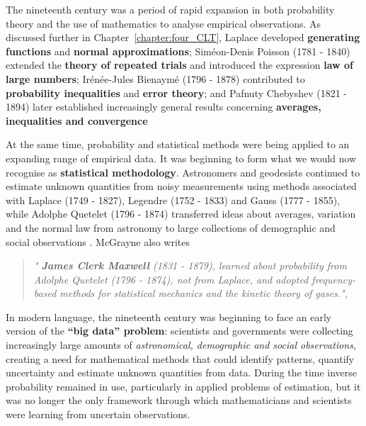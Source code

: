 The nineteenth century was a period of rapid expansion in both probability theory and the use of mathematics to analyse empirical observations. As discussed further in Chapter~\ref{chapter:four_CLT}, Laplace developed \textbf{generating functions} and \textbf{normal approximations}; Siméon-Denis Poisson (1781 - 1840) extended the \textbf{theory of repeated trials} and introduced the expression \textbf{law of large numbers}; Irénée-Jules Bienaymé (1796 - 1878) contributed to \textbf{probability inequalities} and \textbf{error theory}; and Pafnuty Chebyshev (1821 - 1894) later established increasingly general results concerning \textbf{averages, inequalities and convergence} \cite{poissonnn1837} \cite{bienayme1853} \cite{chebyshev1867}

At the same time, probability and statistical methods were being applied to an expanding range of empirical data. It was beginning to form what we would now recognise as \textbf{statistical methodology}. Astronomers and geodesists continued to estimate unknown quantities from noisy measurements using methods associated with Laplace (1749 - 1827), Legendre (1752 - 1833) and Gauss (1777 - 1855), while Adolphe Quetelet (1796 - 1874) transferred ideas about averages, variation and the normal law from astronomy to large collections of demographic and social observations \cite{stigler1986,gauss1809,quetelet1835}. McGrayne also writes 

\begin{quote}
\textit{" \textbf{James Clerk Maxwell} (1831 - 1879), learned about probability from Adolphe Quetelet (1796 - 1874), not from Laplace, and adopted frequency-based methods for statistical mechanics and the kinetic theory of gases.",} \cite{mcgrayne2011}
\end{quote}


In modern language, the nineteenth century was beginning to face an early version of the \textbf{“big data” problem}: scientists and governments were collecting increasingly large amounts of \textit{astronomical, demographic and social observations}, creating a need for mathematical methods that could identify patterns, quantify uncertainty and estimate unknown quantities from data. During the time inverse probability remained in use, particularly in applied problems of estimation, but it was no longer the only framework through which mathematicians and scientists were learning from uncertain observations.

